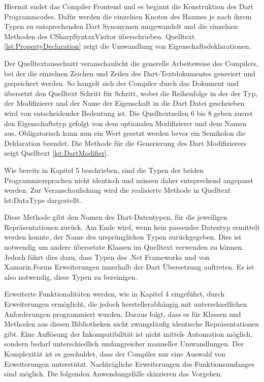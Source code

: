 Hiermit endet das Compiler Frontend und es beginnt die Konstruktion des Dart Programmcodes.  Dafür werden die einzelnen Knoten des Baumes je nach ihrem Typen zu entsprechenden Dart Synonymen umgewandelt und die einzelnen Methoden des \glq CSharpSyntaxVisitor\grq{} überschrieben.  Quelltext \ref{lst:PropertyDeclaration} zeigt die Umwandlung von Eigenschaftsdeklarationen.
\newpage


Der Quelltextausschnitt veranschaulicht die generelle Arbeitsweise des Compilers,  bei der die einzelnen Zeichen und Zeilen des Dart-Textdokumentes generiert und gespeichert werden.  So hangelt sich der Compiler durch das Dokument und übersetzt den Quelltext Schritt für Schritt, wobei die Reihenfolge in der der Typ, der Modifizierer und der Name der Eigenschaft in die Dart Datei geschrieben wird von entscheidender Bedeutung ist.  Die Quelltextzeilen 6 bis 8 geben zuerst den Eigenschaftstyp gefolgt von dem optionalen Modifizierer und dem Namen aus.  Obligatorisch kann nun ein Wert gesetzt werden bevor ein Semikolon die Deklaration beendet.  Die Methode für die Generierung des Dart Modifizierers zeigt Quelltext \ref{lst:DartModifier}.




Wie bereits in Kapitel 5 beschrieben,  sind die Typen der beiden Programmiersprachen nicht identisch und müssen daher entsprechend angepasst werden.  Zur Veranschaulichung wird die realisierte Methode in Quelltext {lst:DataType} dargestellt. 


Diese Methode gibt den Namen des Dart-Datentypen,  für die jeweiligen \Csharp Repräsentationen zurück.  Am Ende wird,  wenn kein passender Datentyp ermittelt werden konnte,  der Name des ursprünglichen Typen zurückgegeben.  Dies ist notwendig um andere übersetzte Klassen im Quelltext verwenden zu können.  Jedoch führt dies dazu,  dass Typen des .Net Frameworks und von Xamarin.Forms Erweiterungen innerhalb der Dart Übersetzung auftreten.  Es ist also notwendig, diese Typen zu bereinigen.  


Erweiterte Funktionalitäten werden, wie in Kapitel 4 eingeführt, durch Erweiterungen ermöglicht, die jedoch herstellerabhängig mit unterschiedlichen Anforderungen programmiert wurden.  Daraus folgt,  dass es für Klassen und Methoden aus diesen Bibliotheken nicht zwangsläufig identische Repräsentationen gibt.  Eine Auflösung der Inkompatibilität ist nicht mittels Automation möglich, sondern bedarf unterschiedlich umfangreicher manueller Umwandlungen.  Der Komplexität ist es geschuldet,  dass der Compiler nur eine Auswahl von Erweiterungen unterstützt.  Nachträgliche Erweiterungen des Funktionsumfanges sind möglich.  Die folgenden Anwendungsfälle skizzieren das Vorgehen.  

